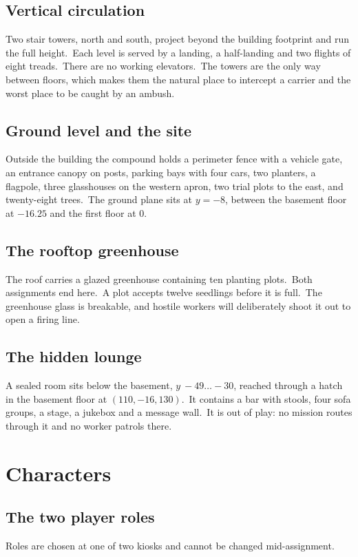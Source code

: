 \subsection{Vertical circulation}
Two stair towers, north and south, project beyond the building footprint and
run the full height.\ Each level is served by a landing, a half-landing and two
flights of eight treads.\ There are no working elevators.\ The towers are the
only way between floors, which makes them the natural place to intercept a
carrier and the worst place to be caught by an ambush.\

\subsection{Ground level and the site}
Outside the building the compound holds a perimeter fence with a vehicle gate,
an entrance canopy on posts, parking bays with four cars, two planters, a
flagpole, three glasshouses on the western apron, two trial plots to the east,
and twenty-eight trees.\ The ground plane sits at $y=-8$, between the basement
floor at $-16.25$ and the first floor at $0$.\

\subsection{The rooftop greenhouse}
The roof carries a glazed greenhouse containing ten planting plots.\ Both
assignments end here.\ A plot accepts twelve seedlings before it is full.\ The
greenhouse glass is breakable, and hostile workers will deliberately shoot it
out to open a firing line.\

\subsection{The hidden lounge}
A sealed room sits below the basement, $y\ -49\ldots-30$, reached through a
hatch in the basement floor at $(110, -16, 130)$.\ It contains a bar with
stools, four sofa groups, a stage, a jukebox and a message wall.\ It is out of
play: no mission routes through it and no worker patrols there.\

\section{Characters}

\subsection{The two player roles}
Roles are chosen at one of two kiosks and cannot be changed mid-assignment.\

